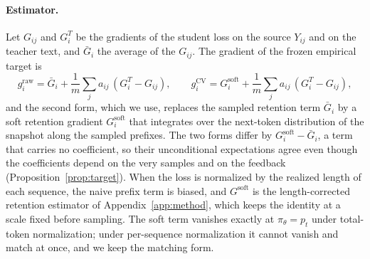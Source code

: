 \paragraph{Estimator.}
Let $G_{ij}$ and $G_i^T$ be the gradients of the student loss on the
source $Y_{ij}$ and on the teacher text, and $\bar G_i$ the average of
the $G_{ij}$. The gradient of the frozen empirical target is
\[
g_i^{\mathrm{raw}}=\bar G_i+\frac{1}{m}\sum_j a_{ij}\,(G_i^T-G_{ij}),
\qquad
g_i^{\mathrm{CV}}=G_i^{\mathrm{soft}}+\frac{1}{m}\sum_j a_{ij}\,(G_i^T-G_{ij}),
\]
and the second form, which we use, replaces the sampled retention term
$\bar G_i$ by a soft retention gradient $G_i^{\mathrm{soft}}$ that
integrates over the next-token distribution of the snapshot along the
sampled prefixes. The two forms differ by $G_i^{\mathrm{soft}}-\bar G_i$,
a term that carries no coefficient, so their unconditional
expectations agree even though the coefficients depend on the very
samples and on the feedback (Proposition~\ref{prop:target}). When the
loss is normalized by the realized length of each sequence, the naive
prefix term is biased, and $G^{\mathrm{soft}}$ is the length-corrected
retention estimator of Appendix~\ref{app:method}, which keeps the
identity at a scale fixed before sampling. The soft term vanishes
exactly at $\pi_\theta=p_t$ under total-token normalization; under
per-sequence normalization it cannot vanish and match at once, and we
keep the matching form.

